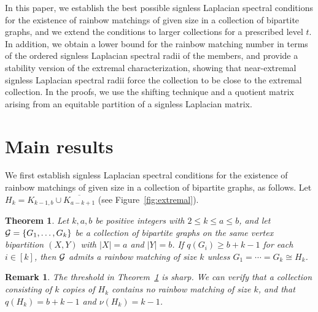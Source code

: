 \documentclass[11pt,a4paper]{article}
\newtheorem{theorem}{Theorem}[section]
\newtheorem{remark}{Remark}[section]
\theoremstyle{definition}
\numberwithin{equation}{section}
\begin{document}
In this paper, we establish the best possible signless Laplacian spectral conditions for the existence of rainbow matchings of given size in a collection of bipartite graphs, and we extend the conditions to larger collections for a prescribed level $t$. In addition, we obtain a lower bound for the rainbow matching number in terms of the ordered signless Laplacian spectral radii of the members, and provide a stability version of the extremal characterization, showing that near-extremal signless Laplacian spectral radii force the collection to be close to the extremal collection. In the proofs, we use the shifting technique and a quotient matrix arising from an equitable partition of a signless Laplacian matrix.


\section{Main results}

We first establish signless Laplacian spectral conditions for the existence of rainbow matchings of given size in a collection of bipartite graphs, as follows. Let $H_k=K_{k-1,b}\cup\overline{K_{a-k+1}}$ (see Figure~\ref{fig:extremal}).

\begin{theorem}
\label{Thm1b}
Let $k,a,b$ be positive integers with $2\le k\le a\le b$, and let ${\cal G}=\{G_1,\ldots,G_k\}$ be a collection of bipartite graphs on the same vertex bipartition $(X,Y)$ with $|X|=a$ and $|Y|=b$. If $q(G_i)\ge b+k-1$ for each $i\in[k]$, then ${\cal G}$ admits a rainbow matching of size $k$ unless $G_1=\cdots=G_k\cong H_k$.
\end{theorem}

\begin{remark}
The threshold in Theorem~\ref{Thm1b} is sharp. We can verify that a collection consisting of $k$ copies of $H_k$ contains no rainbow matching of size $k$, and that $q(H_k)=b+k-1$ and $\nu(H_k)=k-1$.
\end{remark}
\end{document}

